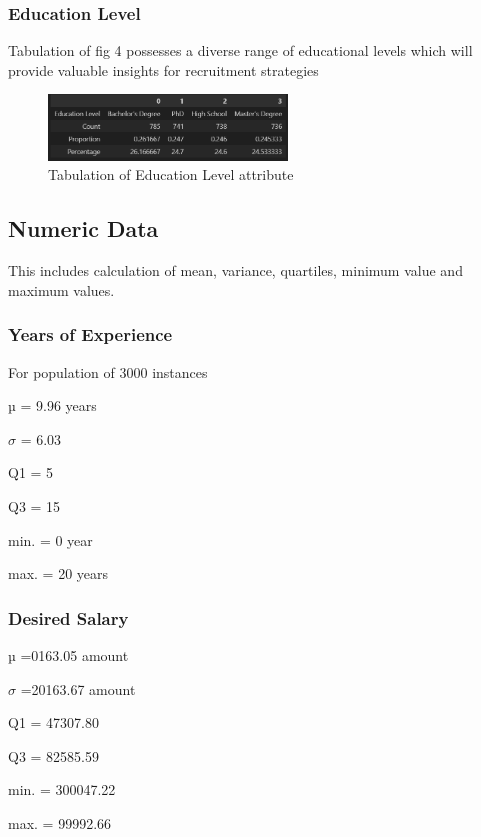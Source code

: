\documentclass[lettersize,journal]{IEEEtran}
\begin{document}
\subsubsection{Education Level}
Tabulation of fig 4 possesses a diverse range of
educational levels which will provide valuable insights for
recruitment strategies


\begin{figure}[h]
\centering
\includegraphics[width=2.5in]{Screenshot 2023-09-08 153027.png}
\caption{Tabulation of Education Level attribute}
\label{fig_4}
\end{figure}

\subsection{Numeric Data}
This includes calculation of mean, variance, quartiles,
minimum value and maximum values.
\subsubsection{Years of Experience}
 For population of 3000 instances
 \begin{list}{}{}  
\item[ µ = 9.96 years]
\item[ $\sigma$ = 6.03]
\item [Q1 = 5]
\item[ Q3 = 15]
\item[ min. = 0 year]
\item[  max. = 20 years]
\end{list}

\subsubsection{Desired Salary}
\begin{list}{}{}
\item[ µ =0163.05 amount]
\item[$\sigma$ =20163.67 amount]
\item[Q1 = 47307.80]
\item[Q3 = 82585.59]
\item[min. = 300047.22]
\item[max. = 99992.66]
\end{list}
    
\end{document}
